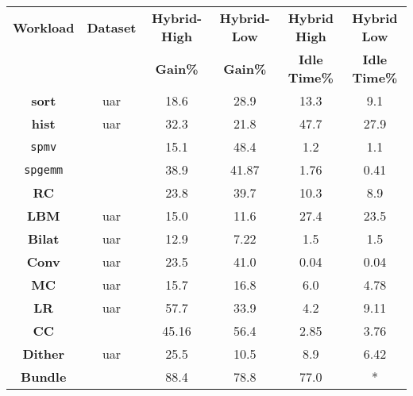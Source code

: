 \documentclass[11pt]{article}
\newcommand{\sgemm} {{\tt spgemm}}
\newcommand{\spmv} {{\tt spmv}}
\newcommand{\bilat} {{\bf Bilat}}
\newcommand{\conv} {{\bf Conv}}
\newcommand{\hist} {{\bf hist}}
\newcommand{\sort} {{\bf sort}}
\newcommand{\LR} {{\bf LR}}
\newcommand{\CC} {{\bf CC}}
\newcommand{\RC} {{\bf RC}}
\newcommand{\MC} {{\bf MC}}
\newcommand{\Bundle} {{\bf Bundle}}
\newcommand{\Dither} {{\bf Dither}}
\newcommand{\LBM} {{\bf LBM}}
\begin{document}
\begin{table*}[htp]
\begin{center}
\begin{tabular}{|c||c|c|c|c|c|}
\hline
{\bf Workload} & {\bf Dataset} & {\bf Hybrid-High} & {\bf
Hybrid-Low } & {\bf Hybrid High } & {\bf Hybrid Low } \\
 & &  {\bf Gain\% } & {\bf Gain\% } & {\bf Idle Time\% } &   {\bf Idle Time\% } \\
\hline
\hline
\sort & uar &  18.6 & 28.9 & 13.3 & 9.1  \\
\hline  
\hist & uar & 32.3 & 21.8 & 47.7 & 27.9 \\
\hline  
\spmv & \cite{vuduc07} & 15.1 & 48.4 & 1.2  & 1.1 \\
\hline  
\sgemm &  \cite{vuduc07} & 38.9 & 41.87 &  1.76 &    0.41\\
\hline  
\RC & \cite{RMBOF07,LGMBP08} &  23.8 & 39.7 &  10.3 &  8.9 \\
\hline  
\LBM & uar & 15.0 &  11.6 &  27.4 &  23.5  \\
\hline  
\bilat & uar &  12.9 & 7.22 & 1.5 & 1.5  \\
\hline  
\conv & uar &  23.5 &  41.0 & 0.04 & 0.04  \\
\hline   
\MC & uar &   15.7& 16.8 &  6.0 & 4.78  \\
\hline  
\LR & uar &  57.7 &  33.9 & 4.2 & 9.11 \\
\hline   
\CC & \cite{rmat} & 45.16 &   56.4 &  2.85 &  3.76  \\
\hline  
\Dither & uar &  25.5 & 10.5 & 8.9 & 6.42 \\
\hline  
\Bundle & \cite{ndurl} &  88.4 &  78.8 & 77.0 & * \\
\hline  
\end{tabular}
\end{center}
\caption{{\sc Summary of results of our implementations on the Hybrid-High and the
Hybrid-Low platforms. The phrase "uar" in the second row refers to the 
dataset that contains
items drawn uniformly at random appropriate for the workload. A citation in
the second row indicates that we have used the datasets from the work
cited. The performance gain indicated is according to the following metric: time
for \sort and \hist, GFlops for \spmv, time for \sgemm, Frames per second
for \RC, time for \LBM, M pixles/sec for \bilat and \conv, and time for \MC, \LR,
\CC, \Dither, and \Bundle. For the \Bundle workload, the idle time on
Hybrid-Low platform is not available.}}
\label{tab:results}
\end{table*}
\end{document}
